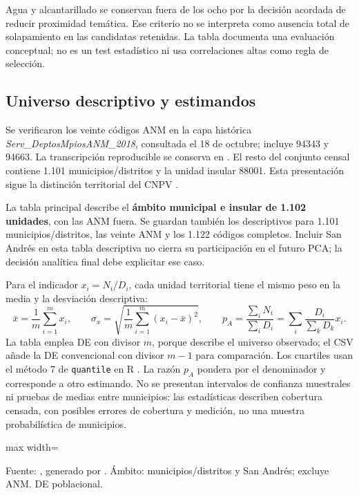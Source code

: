 Agua y alcantarillado se conservan fuera de los ocho por la decisión acordada de reducir proximidad temática. Ese criterio no se interpreta como ausencia total de solapamiento en las candidatas retenidas. La tabla documenta una evaluación conceptual; no es un test estadístico ni usa correlaciones altas como regla de selección.

\subsection{Universo descriptivo y estimandos}

Se verificaron los veinte códigos ANM en la capa histórica \emph{Serv\_DeptosMpiosANM\_2018}, consultada el 18 de octubre; incluye 94343 y 94663. La transcripción reproducible se conserva en . El resto del conjunto censal contiene 1.101 municipios/distritos y la unidad insular 88001. Esta presentación sigue la distinción territorial del CNPV \citep{dane2018divipola,dane2021cnpv}.

La tabla principal describe el \textbf{ámbito municipal e insular de 1.102 unidades}, con las ANM fuera. Se guardan también los descriptivos para 1.101 municipios/distritos, las veinte ANM y los 1.122 códigos completos. Incluir San Andrés en esta tabla descriptiva no cierra su participación en el futuro PCA; la decisión analítica final debe explicitar ese caso.

Para el indicador $x_i=N_i/D_i$, cada unidad territorial tiene el mismo peso en la media y la desviación descriptiva:
\begin{equation}
\bar{x}=\frac{1}{m}\sum_{i=1}^{m}x_i,\qquad
\sigma_x=\sqrt{\frac{1}{m}\sum_{i=1}^{m}(x_i-\bar{x})^2},\qquad
p_A=\frac{\sum_iN_i}{\sum_iD_i}=\sum_i\frac{D_i}{\sum_k D_k}x_i.
\end{equation}
La tabla emplea DE con divisor $m$, porque describe el universo observado; el CSV añade la DE convencional con divisor $m-1$ para comparación. Los cuartiles usan el método 7 de \texttt{quantile} en R \citep{r_core_team}. La razón $p_A$ pondera por el denominador y corresponde a otro estimando. No se presentan intervalos de confianza muestrales ni pruebas de medias entre municipios: las estadísticas describen cobertura censada, con posibles errores de cobertura y medición, no una muestra probabilística de municipios.

\begin{table}[htbp]
\centering\small
\caption{Distribución territorial de cuatro indicadores aprobados, en porcentaje}\label{tab:descriptivos_cuatro_actual}
\begin{adjustbox}{max width=\textwidth}

\end{adjustbox}
\par\footnotesize Fuente: , generado por . Ámbito: municipios/distritos y San Andrés; excluye ANM. DE poblacional.
\end{table}

